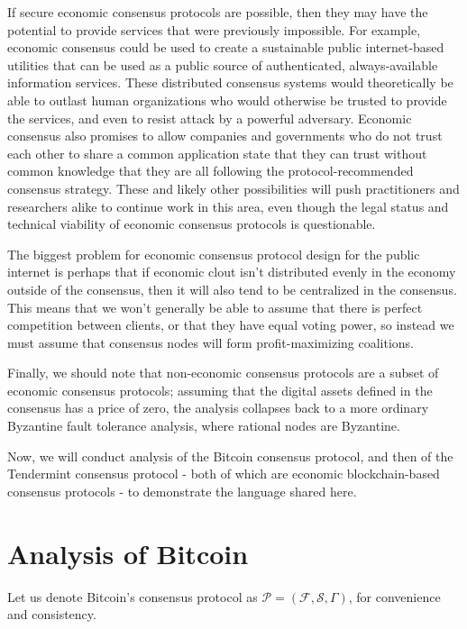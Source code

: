 \documentclass[11pt,a4paper]{article}
\theoremstyle{plain}
\theoremstyle{definition}
\begin{document}
If secure economic consensus protocols are possible, then they may have the potential to provide services that were previously impossible. For example, economic consensus could be used to create a sustainable public internet-based utilities that can be used as a public source of authenticated, always-available information services. 
These distributed consensus systems would theoretically be able to outlast human organizations who would otherwise be trusted to provide the services, and even to resist attack by a powerful adversary. Economic consensus also promises to allow companies and governments who do not trust each other to share a common application state that they can trust without common knowledge that they are all following the protocol-recommended consensus strategy. These and likely other possibilities will push practitioners and researchers alike to continue work in this area, even though the legal status and technical viability of economic consensus protocols is questionable.

The biggest problem for economic consensus protocol design for the public internet is perhaps that if economic clout isn't distributed evenly in the economy outside of the consensus, then it will also tend to be centralized in the consensus. This means that we won't generally be able to assume that there is perfect competition between clients, or that they have equal voting power, so instead we must assume that consensus nodes will form profit-maximizing coalitions.

Finally, we should note that non-economic consensus protocols are a subset of economic consensus protocols; assuming that the digital assets defined in the consensus has a price of zero, the analysis collapses back to a more ordinary Byzantine fault tolerance analysis, where rational nodes are Byzantine. 

Now, we will conduct analysis of the Bitcoin consensus protocol, and then of the Tendermint consensus protocol - both of which are economic blockchain-based consensus protocols - to demonstrate the language shared here.



\section{Analysis of Bitcoin}

Let us denote Bitcoin's consensus protocol as $\mathcal{P} = (\mathcal{F}, \mathcal{S}, \Gamma)$, for convenience and consistency. 
\end{document}
